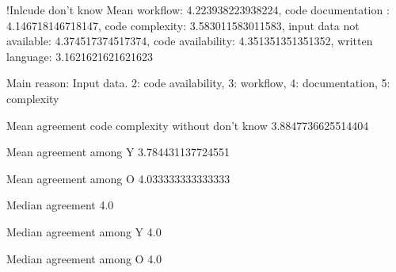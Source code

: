 
!Inlcude don't know Mean workflow: 4.223938223938224, code documentation : 4.146718146718147, code complexity: 3.583011583011583, input data not available: 4.374517374517374, code availability: 4.351351351351352, written language: 3.1621621621621623

Main reason: Input data. 2: code availability, 3: workflow, 4: documentation, 5: complexity

Mean agreement code complexity without don't know 3.8847736625514404

Mean agreement among Y 3.784431137724551

Mean agreement among O 4.033333333333333

Median agreement 4.0

Median agreement among Y 4.0

Median agreement among O 4.0
